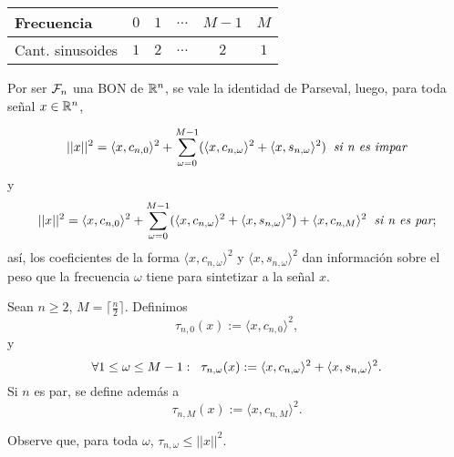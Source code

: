 \vspace{2cm}

\begin{table}[ht]
\centering
  \begin{tabular}{ l | c | c | c | c | c}
    \hline
    Frecuencia & $0$ & $1$ & $\ldots$ & $M-1$ & $M$  \\ \hline
    Cant. sinusoides  & $1$ & $2$ & $\ldots$ & $2$ & $1$ \\
    \hline
  \end{tabular}
\label{Tab: frecuencias TDF n par}
\end{table}

\noindent
Por ser $\mathcal{F}_{n}$ una BON de $\mathbb{R}^{n}$, se vale la
identidad de Parseval, luego, para toda
señal $x \in \mathbb{R}^{n}$,

\begin{equation}
\label{eq0: 25Ap}
||x||^{2} = \langle x , c_{n,0} \rangle^{2}+
\sum\limits_{\omega=0}^{M-1}(\langle x , c_{n,\omega} \rangle^{2} + 
\langle x , s_{n,\omega} \rangle^{2})
\hspace{0.2cm} \textit{si n es impar} 
\end{equation}
y
\begin{equation}
\label{eq1: 25Ap}
||x||^{2} = \langle x , c_{n,0} \rangle^{2}+
\sum\limits_{\omega=0}^{M-1}(\langle x , c_{n,\omega} \rangle^{2} + 
\langle x , s_{n,\omega} \rangle^{2})
+ \langle x , c_{n,M} \rangle^{2}
\hspace{0.2cm} \textit{si n es par};
\end{equation}
así, los coeficientes de la forma
$\langle x , c_{n,\omega} \rangle^{2}$ y 
$\langle x , s_{n,\omega} \rangle^{2}$
dan información sobre el peso que la frecuencia
$\omega$ tiene para sintetizar a la señal $x$.


\begin{defi}
\label{def: taus}
Sean $n \geq 2$, $M = \lceil \frac{n}{2} \rceil $.
Definimos
	\[
	\tau_{n,0}(x) := \langle x, c_{n,0} \rangle^{2},	
	\]
	y
	\[
	\forall 1 \leq \omega \leq M-1: \hspace{0.2cm} 
	\tau_{n,\omega}(x) := \langle x, c_{n,\omega} \rangle^{2}+
	\langle x, s_{n,\omega} \rangle^{2}.	
	\]	
	Si $n$ es par, se define además a
	\[
	\tau_{n,M}(x) := \langle x, c_{n,M} \rangle^{2}.
	\]
\end{defi}
Observe que, para toda $\omega$, 
$\tau_{n, \omega} \leq ||x||^{2}$.

